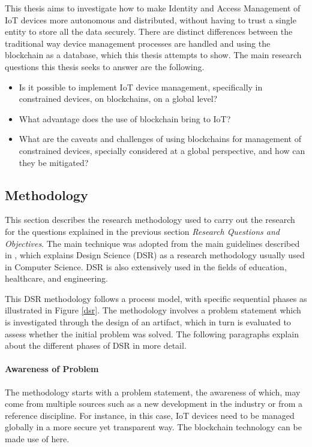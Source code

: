 \documentclass[english]{tktltiki}
\begin{document}
This thesis aims to investigate how to make Identity and Access Management of IoT devices more autonomous and distributed, without having to trust a single entity to store all the data securely. There are distinct differences between the traditional way device management processes are handled and using the blockchain as a database, which this thesis attempts to show. The main research questions this thesis seeks to answer are the following.

\begin{itemize}	
\item Is it possible to implement IoT device management, specifically in constrained devices, on blockchains, on a global level?
\item What advantage does the use of blockchain bring to IoT?
\item What are the caveats and challenges of using blockchains for management of constrained devices, specially considered at a global perspective, and how can they be mitigated?
\end{itemize}


\subsection{Methodology}
This section describes the research methodology used to carry out the research for the questions explained in the previous section \textit{Research Questions and Objectives}. The main technique was adopted from the main guidelines described in \cite{dsr}, which explains Design Science (DSR) as a research methodology usually used in Computer Science. DSR is also extensively used in the fields of education, healthcare, and engineering. 

This DSR methodology follows a process model, with specific sequential phases as illustrated in Figure \ref{dsr}. The methodology involves a problem statement which is investigated through the design of an artifact, which in turn is evaluated to assess whether the initial problem was solved. The following paragraphs explain about the different phases of DSR in more detail.

\paragraph{Awareness of Problem} The methodology starts with a problem statement, the awareness of which, may come from multiple sources such as a new development in the industry or from a reference discipline. For instance, in this case, IoT devices need to be managed globally in a more secure yet transparent way. The blockchain technology can be made use of here.\newline
\end{document}
